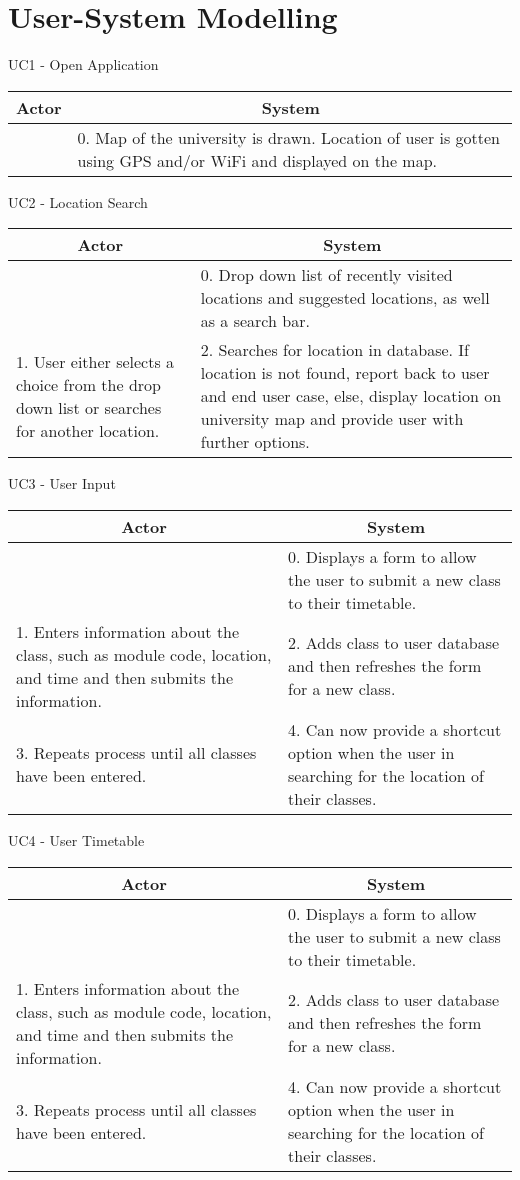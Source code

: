\documentclass{article}
\begin{document}
 \section{User-System Modelling}
 \begin{center}
  UC1 - Open Application
  \begin{tabular}{ |p{5.5cm}|p{5.5cm}| }
    \hline
    \multicolumn{1}{|c|}{Actor} & \multicolumn{1}{c|}{System} \\ \hline
     & 0. Map of the university is drawn. Location of user is gotten using GPS and/or WiFi and displayed on the map. \\ \hline
  \end{tabular}
\hfill \break \hfill \break \hfill \break
  UC2 - Location Search
  \begin{tabular}{ |p{5.5cm}|p{5.5cm}| }
    \hline
    \multicolumn{1}{|c|}{Actor} & \multicolumn{1}{c|}{System} \\ \hline
     &0. Drop down list of recently visited locations and suggested locations, as well as a search bar.\\ \hline
     1. User either selects a choice from the drop down list or searches for another location. &2. Searches for location in database. If location is not found, report back to user and end user case, else, display location on university map and provide user with further options.\\ \hline
  \end{tabular}
\hfill \break \hfill \break \hfill \break
  UC3 - User Input
  \begin{tabular}{ |p{5.5cm}|p{5.5cm}| }
    \hline
    \multicolumn{1}{|c|}{Actor} & \multicolumn{1}{c|}{System} \\ \hline
     &0. Displays a form to allow the user to submit a new class to their timetable.\\ \hline
     1. Enters information about the class, such as module code, location, and time and then submits the information. &2. Adds class to user database and then refreshes the form for a new class.\\ \hline
     3. Repeats process until all classes have been entered. &4. Can now provide a shortcut option when the user in searching for the location of their classes.\\ \hline
  \end{tabular}
\hfill \break \hfill \break \hfill \break
  UC4 - User Timetable
  \begin{tabular}{ |p{5.5cm}|p{5.5cm}| }
    \hline
    \multicolumn{1}{|c|}{Actor} & \multicolumn{1}{c|}{System} \\ \hline
     &0. Displays a form to allow the user to submit a new class to their timetable.\\ \hline
     1. Enters information about the class, such as module code, location, and time and then submits the information. &2. Adds class to user database and then refreshes the form for a new class.\\ \hline
     3. Repeats process until all classes have been entered. &4. Can now provide a shortcut option when the user in searching for the location of their classes.\\ \hline
  \end{tabular}


\end{center}
\end{document}
